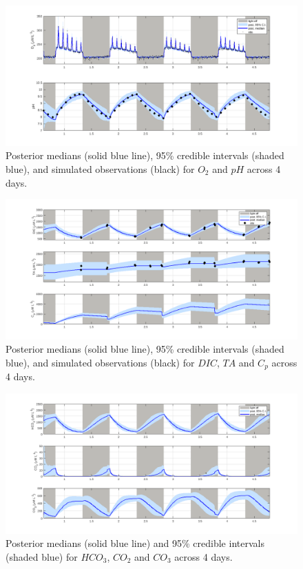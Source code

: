 \documentclass{ruthesis}
\begin{document}
 

\begin{figure}
	\centerline{\includegraphics[width=1.2\textwidth]{images_microalgae/posterior_plots_with_fake_data/O2_pH}}
	\caption[.]{Posterior medians (solid blue line), 95\% credible intervals (shaded blue), and simulated observations (black) for $O_2$ and $pH$ across 4 days.}
	\label{fig:pos_sim_O2_pH}
\end{figure}

\begin{figure}
	\centerline{\includegraphics[width=1.2\textwidth]{images_microalgae/posterior_plots_with_fake_data/DIC_TA_Cp}}
	\caption[.]{Posterior medians (solid blue line), 95\% credible intervals (shaded blue), and simulated observations (black) for $DIC$, $TA$ and $C_p$ across 4 days.}
	\label{fig:pos_sim_DIC_TA_Cp}
\end{figure}

\begin{figure}
	\centerline{\includegraphics[width=1.2\textwidth]{images_microalgae/posterior_plots_with_fake_data/carbon}}
	\caption[.]{Posterior medians (solid blue line) and 95\% credible intervals (shaded blue) for $HCO_3$, $CO_2$ and $CO_3$ across 4 days.}
	\label{fig:pos_sim_carbon}
\end{figure}
\end{document}
